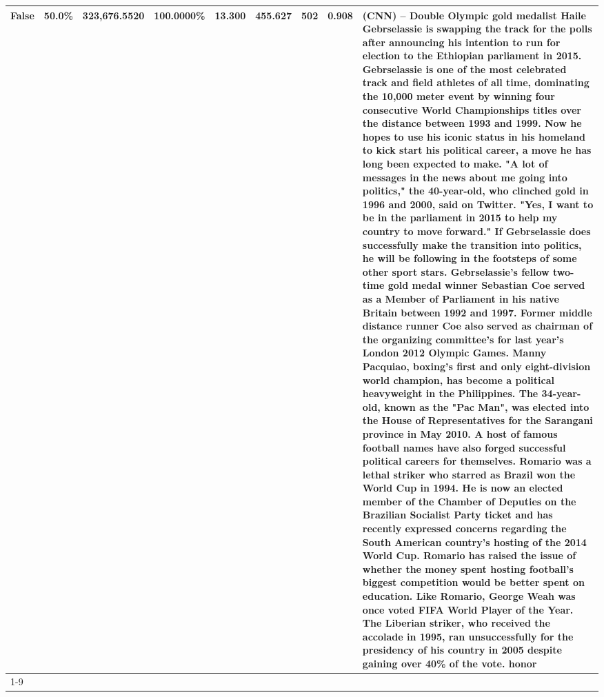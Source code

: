 \begin{table}[H]
{\begin{tabular}{lllrlllll}
False & 50.0\% & 323,676.5520 & \bfseries \color{red} 100.0000\% & 13.300 & 455.627 & 502 & 0.908 & (CNN) -- Double Olympic gold medalist Haile Gebrselassie is swapping the track for the polls after announcing his intention to run for election to the Ethiopian parliament in 2015. Gebrselassie is one of the most celebrated track and field athletes of all time, dominating the 10,000 meter event by winning four consecutive World Championships titles over the distance between 1993 and 1999. Now he hopes to use his iconic status in his homeland to kick start his political career, a move he has long been expected to make. "A lot of messages in the news about me going into politics," the 40-year-old, who clinched gold in 1996 and 2000, said on Twitter. "Yes, I want to be in the parliament in 2015 to help my country to move forward." If Gebrselassie does successfully make the transition into politics, he will be following in the footsteps of some other sport stars. Gebrselassie's fellow two-time gold medal winner Sebastian Coe served as a Member of Parliament in his native Britain between 1992 and 1997. Former middle distance runner Coe also served as chairman of the organizing committee's for last year's London 2012 Olympic Games. Manny Pacquiao, boxing's first and only eight-division world champion, has become a political heavyweight in the Philippines. The 34-year-old, known as the "Pac Man", was elected into the House of Representatives for the Sarangani province in May 2010. A host of famous football names have also forged successful political careers for themselves. Romario was a lethal striker who starred as Brazil won the World Cup in 1994. He is now an elected member of the Chamber of Deputies on the Brazilian Socialist Party ticket and has recently expressed concerns regarding the South American country's hosting of the 2014 World Cup. Romario has raised the issue of whether the money spent hosting football's biggest competition would be better spent on education. Like Romario, George Weah was once voted FIFA World Player of the Year. The Liberian striker, who received the accolade in 1995, ran unsuccessfully for the presidency of his country in 2005 despite gaining over 40\% of the vote. honor \\
\cline{1-9}

\end{tabular}}
\end{table}
